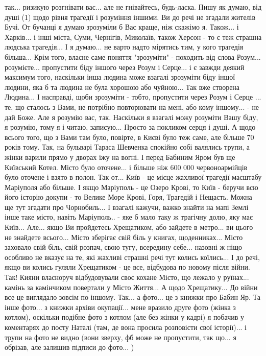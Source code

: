 так... ризикую розгнівати вас... але не гнівайтесь, будь-ласка. Пишу як думаю,
від душі (1) щодо рівня трагедії і розуміння іншими. Ви до речі не згадали
жителів Бучі. От бучанці я думаю зрозуміли б Вас краще, ніж скажімо я. Також...
і Харків... і інші міста, Суми, Чернігів, Миколаїв, також Херсон - то є теж
страшна людська трагедія... І я думаю... не варто надто мірятись тим, у кого
трагедія більша... Крім того, власне саме поняття "зрозуміти" - походить від
слова Розум... розумієте... пропустити біду іншого через Розум і Серце... і є
завжди деякий максимум того, наскільки інша людина може взагалі зрозуміти біду
іншої людини, яка б та людина не була хорошою або чуйною... Так вже створена
Людина... І насправді, щоби зрозуміти - тобто, пропустити через Розум і Серце
... те, що сталось з Вами, не потрібно повторювати на мені, або кому іншому...
- не дай Боже. Але я розумію вас, так. Наскільки я взагалі можу розуміти Вашу
біду, я розумію, тому я і читаю, записую... Просто за покликом серця і душі. А
щодо всього того, що з Вами там було, повірте, в Києві було теж саме, але
більше 70 років тому. Так, на бульварі Тараса Шевченка спокійно собі валялись
трупи, а жінки варили прямо у дворах їжу на вогні. І перед Бабиним Яром був ще
Київський Котел. Місто було оточене... і більше ніж 600 000 червоноармійців
було оточене і взято в полон. Так от... Київ - це місце жахливої трагедії
масштабу Маріуполя або більше. І якщо Маріуполь - це Озеро Крові, то Київ -
беручи всю його історію докупи - то Велике Море Крові, Горя, Трагедій і
Нещасть. Можна ще тут згадати про Чорнобиль... І взагалі кажучи, важко знайти
на мапі Землі інше таке місто, навіть Маріуполь.. - яке б мало таку ж трагічну
долю, яку має Київ... Але... якщо Ви пройдетесь Хрещатиком, або зайдете в
метро... ви цього не знайдете всього... Місто зберігає свій біль у книгах,
щоденниках... Місто заховало свій біль, свій розпач, свою тугу, всередину
себе... назовні ж ніщо особливо не вказує на те, які жахливі страшні речі тут
колись коїлись... І до речі, якщо ви колись гуляли Хрещатиком - це все,
відбудова по новому після війни. Так! Кияни власноруч відбудовували своє кохане
Місто, що лежало у руїнах... камінь за камінчиком повертали у Місто Життя... А
щодо Хрещатику... До війни все це виглядало зовсім по іншому. Так... а фото...
це з книжки про Бабин Яр. Та інше фото... з книжки архіви окупації... мене
вразило друге фото (жінка з котлом), оскільки подібне фото з котлом (але без
жінки у кадрі) я побачив у коментарях до посту Наталі (там, де вона просила
розповісти свої історії)... і трупи на фото не видно (вони зверху, фб може не
пропустити, так що... я обрізав, але залишив підписи до фото... )

